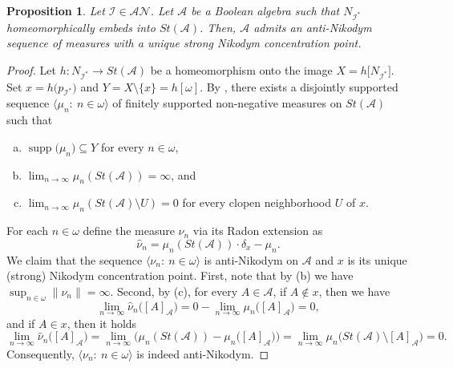 \documentclass[a4paper,11pt,fleqn]{amsart}
\newtheorem{proposition}[theorem]{Proposition}
\theoremstyle{definition}
\theoremstyle{remark}
\numberwithin{equation}{section}
\newcommand{\N}{\mathbb{N}}
\newcommand{\aA}{\mathcal{A}}
\newcommand{\iI}{\mathcal{I}}
\newcommand{\nN}{\mathcal{N}}
\newcommand{\sm}{\setminus}
\newcommand{\sub}{\subseteq}
\DeclareMathOperator{\supp}{supp}
\newcommand{\wh}{\widehat}
\newcommand{\seqn}[1]{\big\langle#1\colon\ n\io\big\rangle}
\newcommand{\clopen}[1]{\left[#1\right]}
\newcommand{\io}{\in\omega}%
\begin{document}
\begin{proposition}\label{prop:nf_strong}
Let $\iI\in\aA\nN$. Let $\aA$ be a Boolean algebra such that $N_{\iI^*}$ homeomorphically embeds into $St(\aA)$. Then, $\aA$ admits an anti-Nikodym sequence of measures with a unique strong Nikodym concentration point.
\end{proposition}
\begin{proof}
    Let $h\colon N_{\iI^*}\to St(\aA)$ be a homeomorphism onto the image $X=h\big[N_{\iI^*}\big]$. Set $x=h\big(p_{\iI^*}\big)$ and $Y=X\sm\{x\}=h[\omega]$. By \cite[Theorem 4.1]{Zuc25}, there exists a disjointly supported sequence $\seqn{\mu_n}$ of finitely supported non-negative measures on $St(\aA)$ such that
    \begin{enumerate}[(a)]
        \item $\supp\big(\mu_n\big)\sub Y$ for every $n\io$,
        \item $\lim_{n\to\infty}\mu_n(St(\aA))=\infty$, and
        \item $\lim_{n\to\infty}\mu_n(St(\aA)\sm U)=0$ for every clopen neighborhood $U$ of $x$.
    \end{enumerate}

    For each $n\io$ define the measure $\nu_n$ via its Radon extension as
    \[\wh{\nu}_n=\mu_n(St(\aA))\cdot\delta_x-\mu_n.\]
    We claim that the sequence $\seqn{\nu_n}$ is anti-Nikodym on $\aA$ and $x$ is its unique (strong) Nikodym concentration point. First, note that by (b) we have $\sup_{n\io}\big\|\nu_n\big\|=\infty$. Second, by (c), for every $A\in\aA$, if $A\not\in x$, then we have
    \[\lim_{n\to\infty}\wh{\nu}_n\big(\clopen{A}_\aA\big)=0-\lim_{n\to\infty}\mu_n\big(\clopen{A}_\aA\big)=0,\]
    and if $A\in x$, then it holds 
    \[\lim_{n\to\infty}\wh{\nu}_n\big(\clopen{A}_\aA\big)=\lim_{n\to\infty}\Big(\mu_n(St(\aA))-\mu_n\big(\clopen{A}_\aA\big)\Big)=\lim_{n\to\infty}\mu_n\big(St(\aA)\sm\clopen{A}_\aA\big)=0.\]
    Consequently, $\seqn{\nu_n}$ is indeed anti-Nikodym.


\end{proof}
\end{document}
